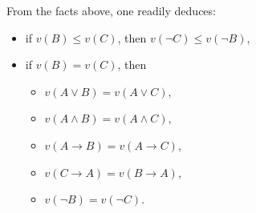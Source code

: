 \documentclass[12pt]{article}
\begin{document}
From the facts above, one readily deduces:
\begin{itemize}
\item if $v(B)\le v(C)$, then $v(\neg C)\le v(\neg B)$,
\item if $v(B)=v(C)$, then
\begin{itemize}
\item $v(A\lor B)= v(A\lor C)$,
\item $v(A\land B)= v(A\land C)$,
\item $v(A\to B)= v(A\to C)$,
\item $v(C\to A)= v(B\to A)$,
\item $v(\neg B)=v(\neg C)$.
\end{itemize}
\end{itemize}

\end{document}
